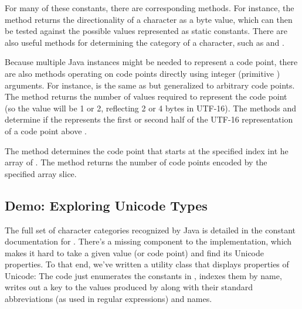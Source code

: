 For many of these constants, there are corresponding methods.  For
instance, the method  returns the
directionality of a character as a byte value, which can then be tested
against the possible values represented as static constants.  There
are also useful methods for determining the category of a character,
such as  and .

Because multiple Java  instances might be needed to
represent a code point, there are also methods operating on code
points directly using integer (primitive ) arguments.  For
instance,  is the same as 
but generalized to arbitrary code points.  The method
 returns the number of  values
required to represent the code point (so the value will be 1 or 2,
reflecting 2 or 4 bytes in UTF-16).  The methods
 and  determine
if the  represents the first or second half of the UTF-16
representation of a code point above .  

The method  determines the code point
that starts at the specified index int he array of .  The
method  returns the number of
code points encoded by the specified  array slice.

\subsection{Demo: Exploring Unicode Types}\label{section:char-unicode-types}

The full set of character categories recognized by Java is detailed in
the constant documentation for .  There's a
missing component to the implementation, which makes it hard to take a
given  value (or code point) and find its Unicode
properties.  To that end, we've written a utility class
 that displays properties of Unicode:
%
%
The code just enumerates the constants in , indexes them
by name, writes out a key to the values produced by
 along with their standard abbreviations
(as used in regular expressions) and names.

